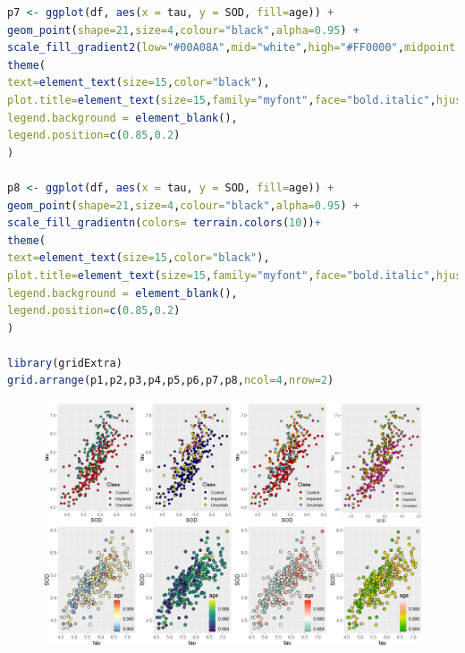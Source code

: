 \documentclass[11pt,a4paper,oneside]{book}
\begin{document}
\begin{lstlisting}[language=r]
p7 <- ggplot(df, aes(x = tau, y = SOD, fill=age)) +
geom_point(shape=21,size=4,colour="black",alpha=0.95) +
scale_fill_gradient2(low="#00A08A",mid="white",high="#FF0000",midpoint = mean(df$age))+
theme(
text=element_text(size=15,color="black"),
plot.title=element_text(size=15,family="myfont",face="bold.italic",hjust=.5,color="black"),
legend.background = element_blank(),
legend.position=c(0.85,0.2)
)

p8 <- ggplot(df, aes(x = tau, y = SOD, fill=age)) +
geom_point(shape=21,size=4,colour="black",alpha=0.95) +
scale_fill_gradientn(colors= terrain.colors(10))+
theme(
text=element_text(size=15,color="black"),
plot.title=element_text(size=15,family="myfont",face="bold.italic",hjust=.5,color="black"),
legend.background = element_blank(),
legend.position=c(0.85,0.2)
)

library(gridExtra)
grid.arrange(p1,p2,p3,p4,p5,p6,p7,p8,ncol=4,nrow=2)
\end{lstlisting}
\begin{figure}[H]
	\centering
	\includegraphics[width=\textwidth]{screenshot045}
\end{figure}
\end{document}
